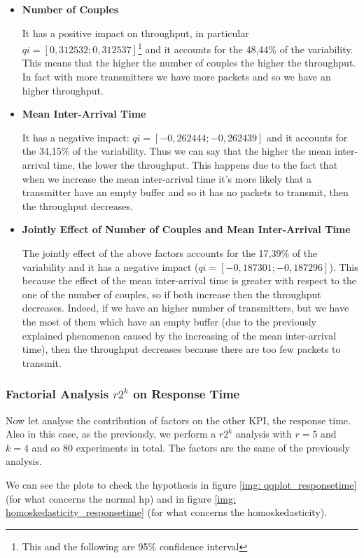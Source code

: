 \begin{itemize}
	\item \textbf{Number of Couples}
	
	\noindent It has a positive impact on throughput, in particular $qi = [0,312532; 0,312537]$\footnote{This and the following are 95\% confidence interval} and it accounts for the 48,44\% of the variability. This means that the higher the number of couples the higher the throughput. In fact with more transmitters we have more packets and so we have an higher throughput.
	 
	\item \textbf{Mean Inter-Arrival Time}
	
	\noindent It has a negative impact: $qi = [-0,262444; -0,262439]$ and it accounts for the 34,15\% of the variability. Thus we can say that the higher the mean inter-arrival time, the lower the throughput. This happens due to the fact that when we increase the mean inter-arrival time it's more likely that a transmitter have an empty buffer and so it has no packets to transmit, then the throughput decreases. 
	
	\item \textbf{Jointly Effect of Number of Couples and Mean Inter-Arrival Time}
	
	\noindent The jointly effect of the above factors accounts for the 17,39\% of the variability and it has a negative impact ($qi = [-0,187301; -0,187296]$). This because the effect of the mean inter-arrival time is greater with respect to the one of the number of couples, so if both increase then the throughput decreases. Indeed, if we have an higher number of transmitters, but we have the most of them which have an empty buffer (due to the previously explained phenomenon caused by the increasing of the mean inter-arrival time), then the throughput decreases because there are too few packets to transmit.
\end{itemize}

\subsubsection{Factorial Analysis $r2^k$ on Response Time}
Now let analyse the contribution of factors on the other KPI, the response time. Also in this case, as the previously, we perform a $r2^k$ analysis with $r=5$ and $k=4$ and so 80 experiments in total. The factors are the same of the previously analysis.

\noindent We can see the plots to check the hypothesis in figure \ref{img: qqplot_responsetime} (for what concerns the normal hp) and in figure \ref{img: homoskedasticity_responsetime} (for what concerns the homoskedasticity).


